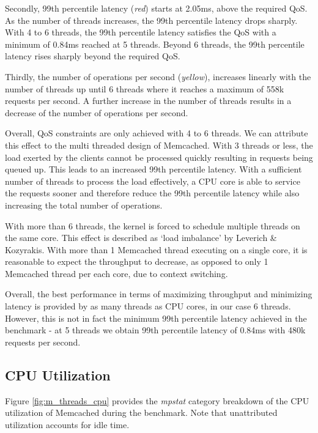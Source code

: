 Secondly, 99th percentile latency (\textit{red}) starts at 2.05ms, above the required QoS. As the number of threads increases, the 99th percentile latency drops sharply. With 4 to 6 threads, the 99th percentile latency satisfies the QoS with a minimum of 0.84ms reached at 5 threads. Beyond 6 threads, the 99th percentile latency rises sharply beyond the required QoS.

Thirdly, the number of operations per second (\textit{yellow}), increases linearly with the number of threads up until 6 threads where it reaches a maximum of 558k requests per second. A further increase in the number of threads results in a decrease of the number of operations per second.

Overall, QoS constraints are only achieved with 4 to 6 threads. We can attribute this effect to the multi threaded design of Memcached. With 3 threads or less, the load exerted by the clients cannot be processed quickly resulting in requests being queued up. This leads to an increased 99th percentile latency. With a sufficient number of threads to process the load effectively, a CPU core is able to service the requests sooner and therefore reduce the 99th percentile latency while also increasing the total number of operations.

With more than 6 threads, the kernel is forced to schedule multiple threads on the same core. This effect is described as `load imbalance' by Leverich \& Kozyrakis. With more than 1 Memcached thread executing on a single core, it is reasonable to expect the throughput to decrease, as opposed to only 1 Memcached thread per each core, due to context switching.

Overall, the best performance in terms of maximizing throughput and minimizing latency is provided by as many threads as CPU cores, in our case 6 threads. However, this is not in fact the minimum 99th percentile latency achieved in the benchmark - at 5 threads we obtain 99th percentile latency of 0.84ms with 480k requests per second.


\subsection{CPU Utilization}

Figure \ref{fig:m_threads_cpu} provides the \textit{mpstat} category breakdown of the CPU utilization of Memcached during the benchmark. Note that unattributed utilization accounts for idle time.

